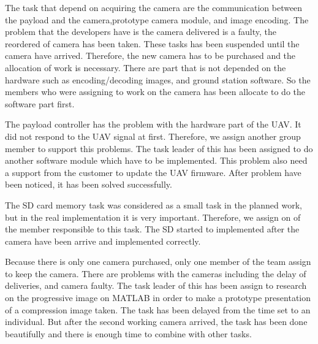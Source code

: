 The task that depend on acquiring the camera are the communication between the payload and the camera,prototype camera module, and image encoding. 
The problem that the developers have is the camera delivered is a faulty, the reordered of camera has been taken.
These tasks has been suspended until the camera have arrived.  
Therefore, the new camera has to be purchased and the allocation of work is necessary. 
There are part that is not depended on the hardware such as encoding/decoding images, and ground station software. 
So the members who were assigning to work on the camera has been allocate to do the software part first.

The payload controller has the problem with the hardware part of the UAV. 
It did not respond to the UAV signal at first. 
Therefore, we assign another group member to support this problems. 
The task leader of this has been assigned to do another software module which have to be implemented. 
This problem also need a support from the customer to update the UAV firmware. 
After problem have been noticed, it has been solved successfully. 

The SD card memory task was considered as a small task in the planned work, but in the real implementation it is very important. 
Therefore, we assign on of the member responsible to this task. 
The SD started to implemented after the camera have been arrive and implemented correctly. 

Because there is only one camera purchased, only one member of the team assign to keep the camera. 
There are problems with the cameras including the delay of deliveries, and camera faulty. 
The task leader of this has been assign to research on the progressive image on MATLAB in order to make a prototype presentation of a compression image taken. 
The task has been delayed from the time set to an individual. 
But after the second working camera arrived, the task has been done beautifully and there is enough time to combine with other tasks.